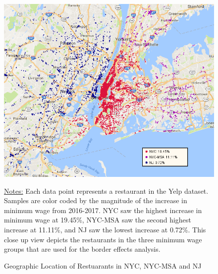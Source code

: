 \documentclass[11pt]{article}
\begin{document}
\begin{figure}[H]
\centering
\caption{Geographic Location of Restuarants in NYC, NYC-MSA and NJ}
\includegraphics[width=6in]{nynj.png}

{\footnotesize \raggedright \underline{Notes:} Each data point represents a restaurant in the Yelp dataset. Samples are color coded by the magnitude of the increase in minimum wage from 2016-2017. NYC saw the highest increase in minimum wage at 19.45\%, NYC-MSA saw the second highest increase at 11.11\%, and NJ saw the lowest increase at 0.72\%. This close up view depicts the restaurants in the three minimum wage groups that are used for the border effects analysis. \par}
\end{figure}
\end{document}
